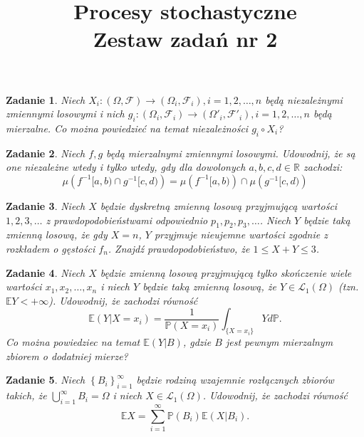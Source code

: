 \documentclass{mwart}
\title{Procesy stochastyczne\\ Zestaw zadań nr 2}
\newtheorem{zd}{Zadanie}
\begin{document}

\maketitle
\begin{zd}
Niech $X_i\colon \left(\Omega, \mathcal{F}\right) \to \left(\Omega_i, \mathcal{F}_i\right), i = 1, 2, \dots, n$ będą niezależnymi zmiennymi losowymi i nich $g_i\colon  \left(\Omega_i, \mathcal{F}_i\right) \to  \left(\Omega'_i, \mathcal{F}'_i\right), i = 1, 2, \dots, n$ będą mierzalne. Co można powiedzieć na temat niezależności $g_i\circ X_i$?
\end{zd}

\begin{zd}
Niech $f, g$ będą mierzalnymi zmiennymi losowymi. Udowodnij, że są one niezależne wtedy i tylko wtedy, gdy dla dowolonych $a, b, c, d\in \mathbb{R}$ zachodzi:
\begin{displaymath}
\mu\left(f^{-1}[a, b)\cap g^{-1}[c, d)\right) = \mu\left(f^{-1}[a, b)\right)\cap \mu\left(g^{-1}[c, d)\right)
\end{displaymath}
\end{zd}

\begin{zd}
Niech $X$ będzie dyskretną zmienną losową przyjmującą wartości $1, 2, 3, \dots$ z prawdopodobieństwami odpowiednio $p_1, p_2, p_3, \dots$. Niech $Y$ będzie taką zmienną losową, że gdy $X=n$, $Y$ przyjmuje nieujemne wartości zgodnie z rozkładem o gęstości $f_n$. Znajdź prawdopodobieństwo, że $1\leq X+Y\leq 3$.
\end{zd}

\begin{zd}
Niech $X$ będzie zmienną losową przyjmującą tylko skończenie wiele wartości $x_1, x_2, \dots, x_n$ i niech $Y$ będzie taką zmienną losową, że $Y\in \mathcal{L}_1\left(\Omega\right)$ (tzn. $\mathbb{E}Y < +\infty$). Udowodnij, że zachodzi równość
\begin{displaymath}
\mathbb{E}\left(Y|X = x_i\right) = \frac{1}{\mathbb{P}\left(X = x_i\right)}\int_{\{X = x_i\}}Yd\mathbb{P}.
\end{displaymath}
Co można powiedziec na temat $\mathbb{E}\left(Y|B\right)$, gdzie $B$ jest pewnym mierzalnym zbiorem o dodatniej mierze?
\end{zd}

\begin{zd}
Niech $\left\{B_i\right\}_{i =1}^{\infty}$ będzie rodziną wzajemnie rozłącznych zbiorów takich, że $\bigcup_{i =1}^{\infty}B_i=\Omega$ i niech $X\in \mathcal{L}_1\left(\Omega\right)$. Udowodnij, że zachodzi równość
\begin{displaymath}
\mathbb{E}X = \sum_{i =1}^{\infty}\mathbb{P}(B_i)\mathbb{E}\left(X|B_i\right).
\end{displaymath}
\end{zd}
\end{document}
